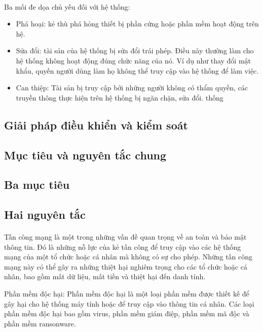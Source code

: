 \paragraph{}
Ba mối đe dọa chủ yếu đối với hệ thống:
\begin{itemize}
    \item Phá hoại: kẻ thù phá hỏng thiết bị phần cứng hoặc phần mềm hoạt động trên hệ.
    \item Sửa đổi: tài sản của hệ thống bị sửa đổi trái phép. Điều này thường làm cho hệ thống không hoạt động đúng chức năng của nó. Ví dụ như thay đổi mật khẩu, quyền người dùng làm họ không thể truy cập vào hệ thống để làm việc.
    \item Can thiệp: Tài sản bị truy cập bởi những người không có thẩm quyền, các truyền thông thực hiện trên hệ thống bị ngăn chặn, sửa đổi.
thống
\end{itemize}
\subsection{Giải pháp điều khiển và kiểm soát}
\subsection{Mục tiêu và nguyên tắc chung}
\subsection{Ba mục tiêu}
\subsection{Hai nguyên tắc}

\paragraph{}
Tấn công mạng là một trong những vấn đề quan trọng về an toàn và bảo mật thông tin. Đó là những nỗ lực của kẻ tấn công để truy cập vào các hệ thống mạng của một tổ chức hoặc cá nhân mà không có sự cho phép. Những tấn công mạng này có thể gây ra những thiệt hại nghiêm trọng cho các tổ chức hoặc cá nhân, bao gồm mất dữ liệu, mất tiền và thiệt hại đến danh tính.

Phần mềm độc hại: Phần mềm độc hại là một loại phần mềm được thiết kế để gây hại cho hệ thống máy tính hoặc để truy cập vào thông tin cá nhân. Các loại phần mềm độc hại bao gồm virus, phần mềm giám điệp, phần mềm mã độc và phần mềm ransonware.

